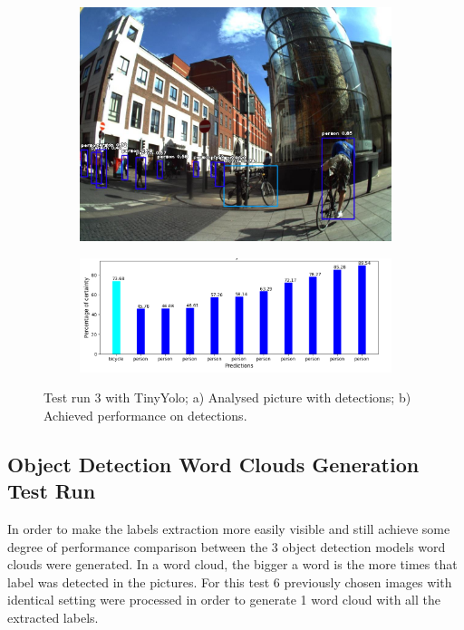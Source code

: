           \begin{figure}[H]
            \centering
            \captionsetup{justification=centering}
    
            \begin{subfigure}{0.29\textwidth}
            \includegraphics[width=\textwidth]{Sections/4InitialWork/4_images_obj_run4/yolo_tiny.jpg} 
            \caption{}
            \end{subfigure}
            \begin{subfigure}{0.65\textwidth}
            \includegraphics[width=\textwidth]{Sections/4InitialWork/4_images_obj_run4/tiny_yolo_graph.png}
            \caption{}
            \end{subfigure}
            
            \caption{ 
            Test run 3 with TinyYolo; a) Analysed picture with detections; b) Achieved performance on detections. }
            \end{figure}


    \newpage

    \subsection{Object Detection Word Clouds Generation Test Run}
    \label{ch:wordclouds}
    In order to make the labels extraction more easily visible and still achieve some degree of performance comparison between the 3 object detection models word clouds were generated. In a word cloud, the bigger a word is the more times that label was detected in the pictures. For this test 6 previously chosen images with identical setting were processed in order to generate 1 word cloud with all the extracted labels.

